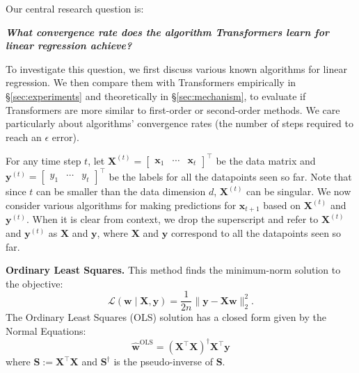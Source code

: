 \documentclass[11pt]{article}
\theoremstyle{plain}
\theoremstyle{definition}
\theoremstyle{remark}
\renewcommand{\^}[1]{^{(#1)}}
\newcommand{\bx}{\boldsymbol{x}}
\newcommand{\bX}{\boldsymbol{X}}
\newcommand{\by}{\boldsymbol{y}}
\newcommand{\bS}{\boldsymbol{S}}
\newcommand{\bw}{\boldsymbol{w}}
\newcommand{\new}[1]{{\color{black} {#1}}}
\renewcommand{\paragraph}[1]{\vspace{1mm}\noindent\textbf{#1}}
\begin{document}
\new{Our central research question is:
\begin{center}

    \textit{\textbf{What convergence rate does the algorithm Transformers learn for linear regression achieve?}}
\end{center}}

To investigate this question, we first discuss various known algorithms for linear regression. We then compare them with Transformers empirically in \S\ref{sec:experiments} and theoretically in \S\ref{sec:mechanism}, to evaluate if Transformers are more similar to first-order or second-order methods. We care particularly about algorithms' convergence rates (the number of steps required to reach an $\epsilon$ error).

For any time step $t$, let $\bX^{(t)} = \begin{bmatrix}
    \bx_1  & \cdots & \bx_t
\end{bmatrix}^\top$ be the data matrix and $\by^{(t)} = \begin{bmatrix}
    y_1 & \cdots & y_t
\end{bmatrix}^\top$ be the labels for all the datapoints seen so far. Note that since $t$ can be smaller than the data dimension $d$, $\bX^{(t)}$ can be singular.  We now consider various algorithms for making predictions for $\bx_{t+1}$ based on $\bX^{(t)}$ and $\by^{(t)}$. When it is clear from context,  we drop the superscript and refer to $\bX^{(t)}$ and $\by^{(t)}$ as $\bX$ and $\by$, where  $\bX$ and $\by$ correspond to all the datapoints seen so far.

\paragraph{Ordinary Least Squares.}
This method finds the minimum-norm solution to the objective:
\begin{equation}
    \mathcal L(\bw \mid \bX, \by) = \frac{1}{2n}\|\by - \bX \bw \|_2^2.
    \label{eqn:obj}
\end{equation}
The Ordinary Least Squares (OLS) solution has a closed form given by the Normal Equations:\begin{equation}
    \hat{\bw}^\mathrm{OLS} = (\bX^\top \bX)^\dagger \bX^\top \by 
\end{equation}
where $\bS := \bX^\top \bX$  and $\bS^\dagger$ is the pseudo-inverse \citep{moonre1920pseudo} of $\bS$.
\end{document}
